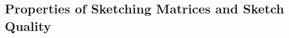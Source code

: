 \documentclass{article}
\begin{document}





\subsection{Properties of Sketching Matrices and Sketch Quality}
\end{document}
